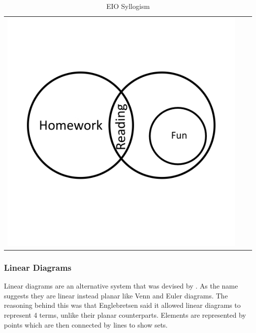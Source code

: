 \documentclass[12pt,a4paper]{report}
\begin{document}
\begin{table}[h!]
\begin{tabular}{  c  c  c }
\begin{minipage}{.22\textwidth}
      \includegraphics[width=\textwidth]{EulerSomeReadingIsNotFun3}
    \end{minipage}
    \\
  \end{tabular}
  \caption{EIO Syllogism}\label{tbl:eulerHomework}
\end{table}
\FloatBarrier


\subsubsection{Linear Diagrams}
Linear diagrams are an alternative system that was devised by \cite{englebretsen1991}. As the name suggests they are linear instead planar like Venn and Euler diagrams. The reasoning behind this was that Englebretsen said it allowed linear diagrams to represent 4 terms, unlike their planar counterparts. Elements are represented by points which are then connected by lines to show sets.
\end{document}
